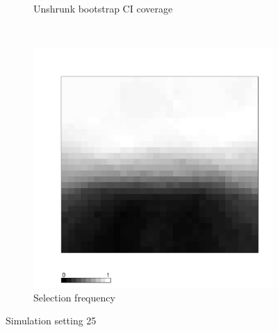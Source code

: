 \documentclass[authoryear, review, 11pt]{elsarticle}
\begin{document}
\begin{figure}
\begin{subfigure}[b]{0.45\textwidth}
		\caption{Unshrunk bootstrap CI coverage}
	\end{subfigure}%
	~ %
	\begin{subfigure}[b]{0.45\textwidth}
	\centering
		\includegraphics[width=\textwidth]{../../figures/simulation/X1.15.25.selection.pdf}
		\caption{Selection frequency}
	\end{subfigure}
	\caption{Simulation setting 25}
\end{figure}
\end{document}
